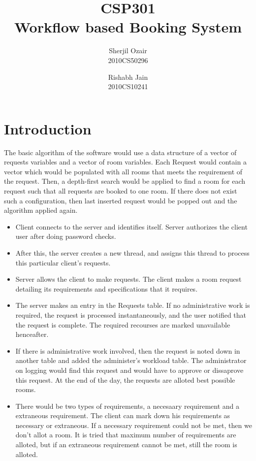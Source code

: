 \documentclass[11pt,a4paper,oneside]{report}
\begin{document}
\begin{titlepage}


\title{CSP301 \\ Workflow based Booking System}
\author{Sherjil Ozair \\ 2010CS50296 \and Rishabh Jain \\ 2010CS10241}
\date{}

\maketitle

\end{titlepage}

\setcounter{chapter}{1}

\section{Introduction}
The basic algorithm of the software would use a data structure of a vector of requests variables and a vector of room variables. Each Request would contain a vector which would be populated with all rooms that meets the requirement of the request. Then, a depth-first search would be applied to find a room for each request such that all requests are booked to one room. If there does not exist such a configuration, then last inserted request would be popped out and the algorithm applied again.

\begin{itemize}
\item{Client connects to the server and identifies itself. Server authorizes the client user after doing password checks.}
\item{After this, the server creates a new thread, and assigns this thread to process this particular client's requests.}
\item{Server allows the client to make requests. The client makes a room request detailing its requirements and specifications that it requires.}
\item{The server makes an entry in the Requests table. If no administrative work is required, the request is processed instantaneously, and the user notified that the request is complete. The required recourses are marked unavailable henceafter.}
\item{If there is administrative work involved, then the request is noted down in another table and added the administer's workload table. The administrator on logging would find this request and would have to approve or dissaprove this request. At the end of the day, the requests are alloted best possible rooms.}
\item{There would be two types of requirements, a necesaary requirement and a extraneous requirement. The client can mark down his requirements as necessary or extraneous. If a necessary requirement could not be met, then we don't allot a room. It is tried that maximum number of requirements are alloted, but if an extraneous requirement cannot be met, still the room is alloted.}
\end{itemize}
\end{document}
